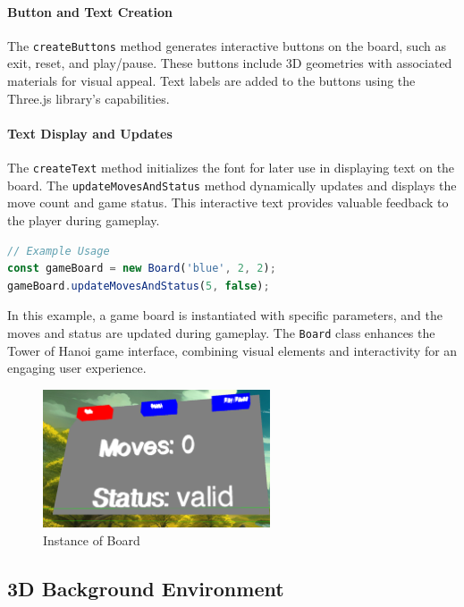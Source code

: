 \documentclass{article}
\begin{document}
\paragraph{Button and Text Creation}
The \texttt{createButtons} method generates interactive buttons on the board, such as exit, reset, and play/pause. These buttons include 3D geometries with associated materials for visual appeal. Text labels are added to the buttons using the Three.js library's capabilities.

\paragraph{Text Display and Updates}
The \texttt{createText} method initializes the font for later use in displaying text on the board. The \texttt{updateMovesAndStatus} method dynamically updates and displays the move count and game status. This interactive text provides valuable feedback to the player during gameplay.

\begin{lstlisting}[language=JavaScript, caption={JS Example for Board}]
// Example Usage
const gameBoard = new Board('blue', 2, 2);
gameBoard.updateMovesAndStatus(5, false);
\end{lstlisting}

In this example, a game board is instantiated with specific parameters, and the moves and status are updated during gameplay. The \texttt{Board} class enhances the Tower of Hanoi game interface, combining visual elements and interactivity for an engaging user experience.

\begin{figure}[h]
    \centering
    \includegraphics[width=0.6\textwidth]{img/board.png}
    \caption{Instance of Board}
    \label{fig:board}
\end{figure}


\subsection{3D Background Environment}
\end{document}
